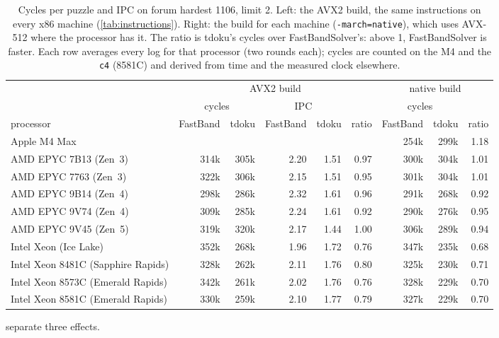 \documentclass[11pt]{article}
\theoremstyle{definition}
\theoremstyle{plain}
\begin{document}
\begin{table}[t]
\centering
\caption{Cycles per puzzle and IPC on forum hardest 1106, limit 2. Left: the AVX2 build, the same instructions on every
x86 machine (\cref{tab:instructions}). Right: the build for each machine (\texttt{-march=native}), which uses AVX-512
where the processor has it. The ratio is tdoku's cycles over FastBandSolver's: above 1, FastBandSolver is faster. Each
row averages every log for that processor (two rounds each); cycles are counted on the M4 and the \texttt{c4}
(8581C) and derived from time and the measured clock elsewhere.}
\label{tab:cycles}
\footnotesize
\setlength{\tabcolsep}{3pt}
\begin{tabular}{lrrrrrrrr}
\toprule
& \multicolumn{5}{c}{AVX2 build} & \multicolumn{3}{c}{native build} \\
\cmidrule(lr){2-6} \cmidrule(lr){7-9}
& \multicolumn{2}{c}{cycles} & \multicolumn{2}{c}{IPC} & & \multicolumn{2}{c}{cycles} & \\
\cmidrule(lr){2-3} \cmidrule(lr){4-5} \cmidrule(lr){7-8}
processor & FastBand & tdoku & FastBand & tdoku & ratio & FastBand & tdoku & ratio \\
\midrule
Apple M4 Max & & & & & & 254k & 299k & 1.18 \\
\midrule
AMD EPYC 7B13 (Zen~3) & 314k & 305k & 2.20 & 1.51 & 0.97 & 300k & 304k & 1.01 \\
AMD EPYC 7763 (Zen~3) & 322k & 306k & 2.15 & 1.51 & 0.95 & 301k & 304k & 1.01 \\
AMD EPYC 9B14 (Zen~4) & 298k & 286k & 2.32 & 1.61 & 0.96 & 291k & 268k & 0.92 \\
AMD EPYC 9V74 (Zen~4) & 309k & 285k & 2.24 & 1.61 & 0.92 & 290k & 276k & 0.95 \\
AMD EPYC 9V45 (Zen~5) & 319k & 320k & 2.17 & 1.44 & 1.00 & 306k & 289k & 0.94 \\
Intel Xeon (Ice Lake) & 352k & 268k & 1.96 & 1.72 & 0.76 & 347k & 235k & 0.68 \\
Intel Xeon 8481C (Sapphire Rapids) & 328k & 262k & 2.11 & 1.76 & 0.80 & 325k & 230k & 0.71 \\
Intel Xeon 8573C (Emerald Rapids) & 342k & 261k & 2.02 & 1.76 & 0.76 & 328k & 229k & 0.70 \\
Intel Xeon 8581C (Emerald Rapids) & 330k & 259k & 2.10 & 1.77 & 0.79 & 327k & 229k & 0.70 \\
\bottomrule
\end{tabular}
\end{table}

 separate three effects.
\end{document}
